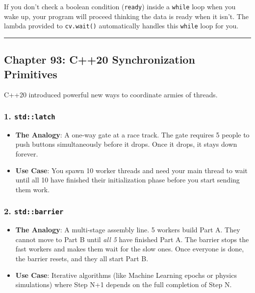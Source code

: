If you don't check a boolean condition (\passthrough{\lstinline!ready!})
inside a \passthrough{\lstinline!while!} loop when you wake up, your
program will proceed thinking the data is ready when it isn't. The
lambda provided to \passthrough{\lstinline!cv.wait()!} automatically
handles this \passthrough{\lstinline!while!} loop for you.

\begin{center}\rule{0.5\linewidth}{0.5pt}\end{center}

\hypertarget{chapter-93-c20-synchronization-primitives}{%
\subsection{Chapter 93: C++20 Synchronization
Primitives}\label{chapter-93-c20-synchronization-primitives}}

C++20 introduced powerful new ways to coordinate armies of threads.

\hypertarget{stdlatch}{%
\subsubsection{\texorpdfstring{1.
\texttt{std::latch}}{1. std::latch}}\label{stdlatch}}

\begin{itemize}
\tightlist
\item
  \textbf{The Analogy}: A one-way gate at a race track. The gate
  requires 5 people to push buttons simultaneously before it drops. Once
  it drops, it stays down forever.
\item
  \textbf{Use Case}: You spawn 10 worker threads and need your main
  thread to wait until all 10 have finished their initialization phase
  before you start sending them work.
\end{itemize}

\hypertarget{stdbarrier}{%
\subsubsection{\texorpdfstring{2.
\texttt{std::barrier}}{2. std::barrier}}\label{stdbarrier}}

\begin{itemize}
\tightlist
\item
  \textbf{The Analogy}: A multi-stage assembly line. 5 workers build
  Part A. They cannot move to Part B until \emph{all 5} have finished
  Part A. The barrier stops the fast workers and makes them wait for the
  slow ones. Once everyone is done, the barrier resets, and they all
  start Part B.
\item
  \textbf{Use Case}: Iterative algorithms (like Machine Learning epochs
  or physics simulations) where Step N+1 depends on the full completion
  of Step N.
\end{itemize}

